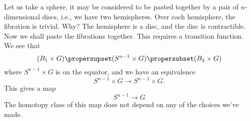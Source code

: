 Let us take a sphere, it may be considered to be pasted together
by a pair of $n$-dimensional discs, i.e., we have two
hemispheres. Over each hemisphere, the fibration is trivial. Why?
The hemisphere is a disc, and the disc is contractible. Now we
shall paste the fibrations together. This requires a transition
function. We see that
\begin{equation}
(B_{1}\times G)\propersupset (S^{n-1}\times G)\propersubset
(B_{2}\times G)
\end{equation}
where $S^{n-1}\times G$ is on the equator, and we have an
equivalence
\begin{equation}
S^{n-1}\times G\to S^{n-1}\times G.
\end{equation}
This gives a map
\begin{equation}
S^{n-1}\to G
\end{equation}
The homotopy class of this map does not depend on any of the
choices we've made.
